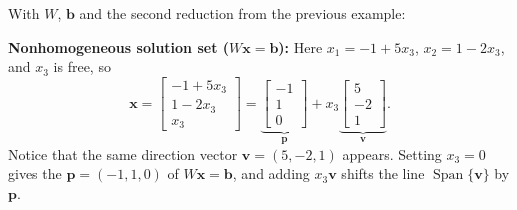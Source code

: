 \documentclass[10pt]{scrartcl}
\newcommand{\vv}[1]{\mathbf{#1}}
\DeclareMathOperator{\spn}{Span}
\begin{document}
\begin{example*}[Comparing $A\vv x=\vv 0$ and $A\vv x=\vv b$: the nonhomogeneous system]
With $W$, $\vv b$ and the second reduction from the previous example:
\begin{itemize}
  \ii \textbf{Nonhomogeneous solution set ($W\vv x=\vv b$):} Here $x_1=-1+5x_3$, $x_2=1-2x_3$, and $x_3$ is free, so
  \[
    \vv x = \begin{bmatrix} -1+5x_3 \\ 1-2x_3 \\ x_3 \end{bmatrix} = \underbrace{\begin{bmatrix} -1 \\ 1 \\ 0 \end{bmatrix}}_{\vv p} + x_3\underbrace{\begin{bmatrix} 5 \\ -2 \\ 1 \end{bmatrix}}_{\vv v}.
  \]
  Notice that the same direction vector $\vv v=(5,-2,1)$ appears. Setting $x_3=0$ gives the  $\vv p=(-1,1,0)$ of $W\vv x=\vv b$, and adding $x_3\vv v$ shifts the line $\spn\{\vv v\}$ by $\vv p$.
\end{itemize}
\end{example*}
\end{document}
